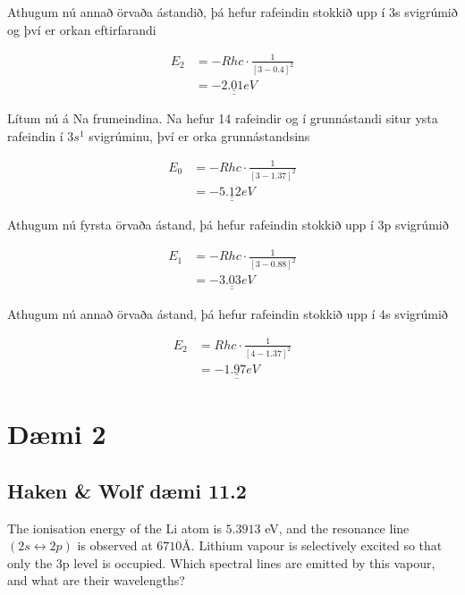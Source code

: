 \documentclass[11pt]{article}
\begin{document}
\noindent Athugum nú annað örvaða ástandið, þá hefur rafeindin stokkið upp í 3s svigrúmið og því er orkan eftirfarandi

\begin{align*}
E_2 &= -Rhc\cdot \frac{1}{[3-0.4]^2}\\
	&= \underline{\underline{-2.01 eV}}
\end{align*}

\noindent Lítum nú á Na frumeindina. Na hefur 14 rafeindir og í grunnástandi situr ysta rafeindin í $3s^1$ svigrúminu, því er orka grunnástandsins

\begin{align*}
E_0 &= -Rhc \cdot \frac{1}{[3-1.37]^2}\\
	&= \underline{\underline{-5.12 eV}}
\end{align*}

\noindent Athugum nú fyrsta örvaða ástand, þá hefur rafeindin stokkið upp í 3p svigrúmið

\begin{align*}
E_1 &= -Rhc \cdot \frac{1}{[3-0.88]^2}\\
	&= \underline{\underline{-3.03 eV}}
\end{align*}

\noindent Athugum nú annað örvaða ástand, þá hefur rafeindin stokkið upp í 4s svigrúmið

\begin{align*}
E_2 &= Rhc \cdot \frac{1}{[4-1.37]^2}\\
	&= \underline{\underline{-1.97 eV}}
\end{align*}

\section*{Dæmi 2}
\subsection*{Haken \& Wolf dæmi 11.2}
The ionisation energy of the Li atom is $5.3913$ eV, and the resonance line $(2s\leftrightarrow 2p)$ is observed at $6710 Å$. Lithium vapour is selectively excited so that only the 3p level is occupied. Which spectral lines are emitted by this vapour, and what are their wavelengths?
\end{document}
